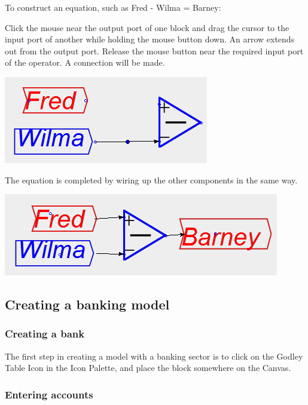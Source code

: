 To construct an equation, such as Fred - Wilma = Barney:

Click the mouse near the output port of one block and drag the cursor
to the input port of another while holding the mouse button down.
An arrow extends out from the output port. Release the mouse button
near the required input port of the operator. A connection will be
made.
\begin{center}
\includegraphics{images/NewItem181} 
\par\end{center}

The equation is completed by wiring up the other components in the
same way.
\begin{center}
\includegraphics{images/NewItem182} 
\par\end{center}

\subsection{Creating a banking model}

\label{creatingBankingModel}

\subsubsection{Creating a bank}

The first step in creating a model with a banking sector is to click
on the Godley Table Icon in the Icon Palette, and place the block
somewhere on the Canvas.

\subsubsection{Entering accounts}

